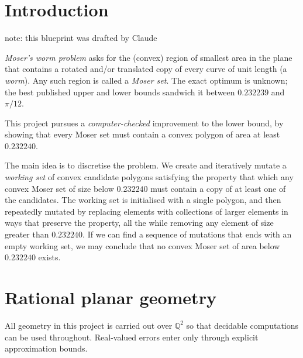 %

\chapter{Introduction}

note: this blueprint was drafted by Claude

\emph{Moser's worm problem} asks for the (convex) region of smallest area in
the plane that contains a rotated and/or translated copy of every curve of unit
length (a \emph{worm}). Any such region is called a \emph{Moser set}. The
exact optimum is unknown; the best published upper and lower bounds sandwich
it between $0.232239$ and $\pi/12$. 

This project pursues a \emph{computer-checked} improvement to the lower bound, by showing that every Moser set must contain a convex polygon of area at least $0.232240$. 

The main idea is to discretise the problem. We create and iteratively mutate a \emph{working set} of convex
candidate polygons satisfying the property that which any convex Moser set of size below $0.232240$ must contain a copy of at least one of the candidates. 
The working set is initialised with a single polygon, and then repeatedly mutated
by replacing elements with collections of larger elements in ways that preserve the property, all the while removing any element of size greater than $0.232240$.
If we can find a sequence of mutations that ends with an empty working set, we may conclude that no convex Moser set of area below $0.232240$ exists.

\chapter{Rational planar geometry}

All geometry in this project is carried out over $\mathbb{Q}^2$ so that
decidable computations can be used throughout. Real-valued errors enter
only through explicit approximation bounds.

